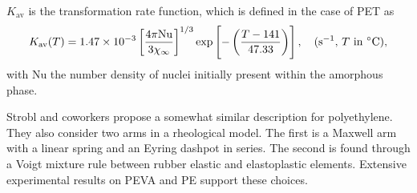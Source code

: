 $K_\text{av}$ is the transformation rate function, which is defined in the case of PET as
\begin{equation}
	K_\text{av}(T) = 1.47\times 10^{-3} \left[\frac{4\pi \mathrm{Nu}}{3\chi_\infty}\right]^{1/3} \exp\left[-\left(\frac{T - 141}{47.33}\right)\right], \quad \text{(\si{\per\second}, $T$ in \si{\celsius})},
\end{equation}
with $\mathrm{Nu}$ the number density of nuclei initially present within the amorphous phase.

Strobl and coworkers \citep{hongModelTreatingTensile2004, hongModelTreatmentTensile2004, naViscousForceDominatedTensileDeformation2006} propose a somewhat similar description for polyethylene.
They also consider two arms in a rheological model.
The first is a Maxwell arm with a linear spring and an Eyring dashpot in series.
The second is found through a Voigt mixture rule between rubber elastic and elastoplastic elements.
Extensive experimental results on PEVA and PE support these choices.

